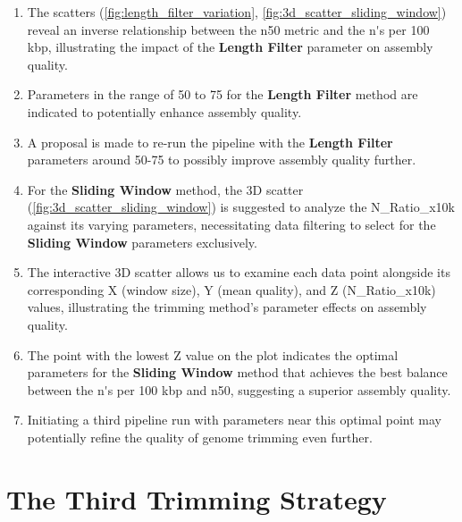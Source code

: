 \begin{enumerate}
  \item The \gls{scatter}s (\autoref{fig:length_filter_variation}, \autoref{fig:3d_scatter_sliding_window}) reveal an inverse relationship between the \gls{n50} metric and the \gls{n's per 100 kbp}, illustrating the impact of the \textbf{Length Filter} parameter on \gls{assembly} quality.
  \item Parameters in the range of 50 to 75 for the \textbf{Length Filter} method are indicated to potentially enhance \gls{assembly} quality.
  \item A proposal is made to re-run the pipeline with the \textbf{Length Filter} parameters around 50-75 to possibly improve \gls{assembly} quality further.
  \item For the \textbf{Sliding Window} method, the 3D \gls{scatter} (\autoref{fig:3d_scatter_sliding_window}) is suggested to analyze the N\_Ratio\_x10k against its varying parameters, necessitating data filtering to select for the \textbf{Sliding Window} parameters exclusively.
  \item The interactive 3D \gls{scatter} allows us to examine each data point alongside its corresponding X (window size), Y (mean quality), and Z (N\_Ratio\_x10k) values, illustrating the \gls{trimming} method's parameter effects on \gls{assembly} quality.
  \item The point with the lowest Z value on the plot indicates the optimal parameters for the \textbf{Sliding Window} method that achieves the best balance between the \gls{n's per 100 kbp} and \gls{n50}, suggesting a superior \gls{assembly} quality.
  \item Initiating a third pipeline run with parameters near this optimal point may potentially refine the quality of \gls{genome} \gls{trimming} even further.
\end{enumerate}





\section{The Third Trimming Strategy }  \label{sec:3rd_trimming_stratrgy}


